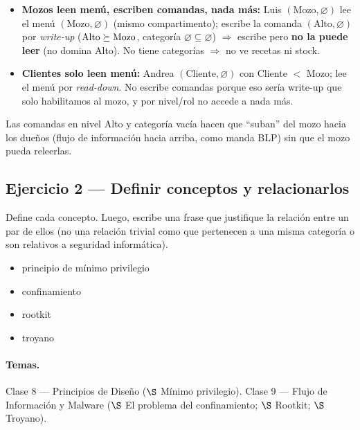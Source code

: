 \begin{itemize}
        ($\{\textsf{T}\}$ vs $\{\textsf{D},\textsf{S}\}$) son \textbf{incomparables}
        $\Rightarrow$ están separados: Ramón no lee ni escribe objetos de platos y viceversa
        (\emph{need-to-know} puro, sin necesidad de regla extra).
  \item \textbf{Mozos leen menú, escriben comandas, nada más:} Luis $(\text{Mozo},\varnothing)$
        lee el menú $(\text{Mozo},\varnothing)$ (mismo compartimento); escribe la comanda
        $(\text{Alto},\varnothing)$ por \emph{write-up} ($\text{Alto}\succeq\text{Mozo}$, categoría
        $\varnothing\subseteq\varnothing$) $\Rightarrow$ escribe pero \textbf{no la puede
        leer} (no domina Alto). No tiene categorías $\Rightarrow$ no ve recetas ni stock.
  \item \textbf{Clientes solo leen menú:} Andrea $(\text{Cliente},\varnothing)$ con
        Cliente $<$ Mozo; lee el menú por \emph{read-down}. No escribe comandas porque eso
        sería write-up que solo habilitamos al mozo, y por nivel/rol no accede a nada más.
\end{itemize}

\noindent Las comandas en nivel Alto y categoría vacía hacen que ``suban'' del mozo hacia los
dueños (flujo de información hacia arriba, como manda BLP) sin que el mozo pueda releerlas.

\subsection{Ejercicio 2 --- Definir conceptos y relacionarlos}

\begin{consigna}
Define cada concepto. Luego, escribe una frase que justifique la relación entre un par de ellos
(no una relación trivial como que pertenecen a una misma categoría o son relativos a seguridad
informática).
\begin{itemize}
  \item principio de mínimo privilegio
  \item confinamiento
  \item rootkit
  \item troyano
\end{itemize}
\end{consigna}

\paragraph{Temas.}
Clase 8 --- Principios de Diseño ($\S$ Mínimo privilegio). Clase 9 --- Flujo de Información y
Malware ($\S$ El problema del confinamiento; $\S$ Rootkit; $\S$ Troyano).

